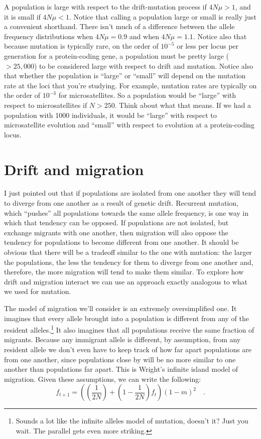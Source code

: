 \documentclass[12pt]{article}
\begin{document}
A population is large with respect to the drift-mutation process if
$4N\mu > 1$, and it is small if $4N\mu < 1$. Notice that calling a
population large or small is really just a convenient shorthand. There
isn't much of a difference between the allele frequency distributions
when $4N\mu = 0.9$ and when $4N\mu = 1.1$. Notice also that because
mutation is typically rare, on the order of $10^{-5}$ or less per
locus per generation for a protein-coding gene, a population must be
pretty large ($> 25,000$) to be considered large with respect to
drift and mutation. Notice also that whether the population is ``large''
or ``small'' will depend on the mutation rate at the loci that you're
studying. For example, mutation rates are typically on the order of 
$10^{-3}$ for microsatellites. So a population would be ``large'' with
respect to microsatellites if $N > 250$. Think about what that
means. If we had a population with 1000 individuals, it would be
``large'' with respect to microsatellite evolution and ``small'' with
respect to evolution at a protein-coding locus.

\section*{Drift and migration}

I just pointed out that if populations are isolated from one another
they will tend to diverge from one another as a result of genetic
drift. Recurrent mutation, which ``pushes'' all populations towards
the same allele frequency, is one way in which that tendency can be
opposed. If populations are not isolated, but exchange migrants with
one another, then migration will also oppose the tendency for
populations to become different from one another. It should be obvious
that there will be a tradeoff similar to the one with mutation: the
larger the populations, the less the tendency for them to diverge from
one another and, therefore, the more migration will tend to make them
similar. To explore how drift and migration interact we can use an
approach exactly analogous to what we used for mutation.

The model of migration we'll consider is an extremely oversimplified
one. It imagines that every allele brought into a population is
different from any of the resident alleles.\footnote{Sounds a lot like
  the infinite alleles model of mutation, doesn't it? Just you
  wait. The parallel gets even more striking.} It also imagines that
all populations receive the same fraction of migrants. Because any
immigrant allele is different, by assumption, from any resident allele
we don't even have to keep track of how far apart populations are from
one another, since populations close by will be no more similar to one
another than populations far apart. This is Wright's infinite island
model of migration. Given these assumptions, we can write the
following:
\begin{equation}
f_{t+1} = \left(\left(\frac{1}{2N}\right) +
          \left(1 - \frac{1}{2N}\right)f_t\right)(1-m)^2 \quad
\label{eq:f-m} .
\end{equation}
\end{document}
